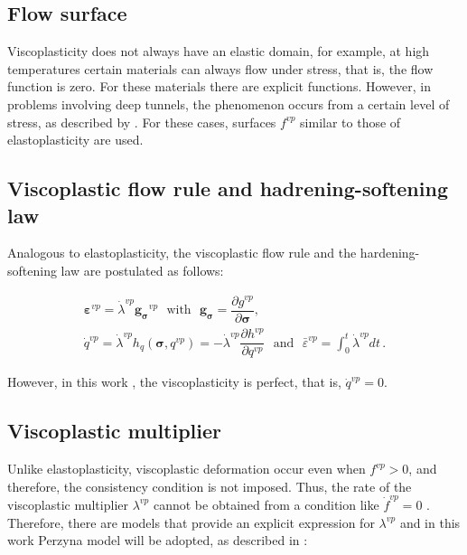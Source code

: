 \documentclass[Journal,letterpaper]{ascelike-new}
\newcommand{\dgds}{\boldsymbol{g_\sigma}}
\newcommand{\hl}{{h_q}}
\newcommand{\strainvp}{\boldsymbol{\varepsilon}^{vp}}
\newcommand{\strainvpeq}{\bar \varepsilon^{vp}}
\newcommand{\stress}{\boldsymbol{\sigma}}
\begin{document}
\subsection{Flow surface}

Viscoplasticity does not always have an elastic domain, for example, at high temperatures certain materials can always flow under stress, that is, the flow function is zero. For these materials there are explicit functions. However, in problems involving deep tunnels, the phenomenon occurs from a certain level of stress, as described by . For these cases, surfaces $f^{vp}$ similar to those of elastoplasticity are used.

\subsection{Viscoplastic flow rule and hadrening-softening law}

Analogous to elastoplasticity, the viscoplastic flow rule and the hardening-softening law are postulated as follows:

\begin{equation} \label{eq_plastic_flow_rule}
	\begin{array}{lcl}
		\strainvp = \dot \lambda^{vp} \dgds^{vp} ~~~ \text{with} ~~~ \dgds = \dfrac{\partial g^{vp}}{\partial \stress}, \\ 
		\dot q^{vp} = \dot \lambda^{vp} \hl(\stress,q^{vp}) = - \dot \lambda^{vp} \dfrac{\partial h^{vp}}{\partial q^{vp}} ~~~\text{and} ~~~ \strainvpeq = \int_{0}^{t} \dot \lambda^{vp} dt  \,.
	\end{array}
\end{equation}

However, in this work , the viscoplasticity is perfect, that is, $\dot q^{vp} = 0$.

\subsection{Viscoplastic multiplier}

Unlike elastoplasticity, viscoplastic deformation occur even when $f^{vp} > 0$, and therefore, the consistency condition is not imposed. Thus, the rate of the viscoplastic multiplier $\lambda^{vp}$ cannot be obtained from a condition like $\dot f^{vp} = 0$ . Therefore, there are models that provide an explicit expression for $\lambda^{vp}$ and in this work Perzyna model \cite{perzyna1966} will be adopted, as described in :
\end{document}
